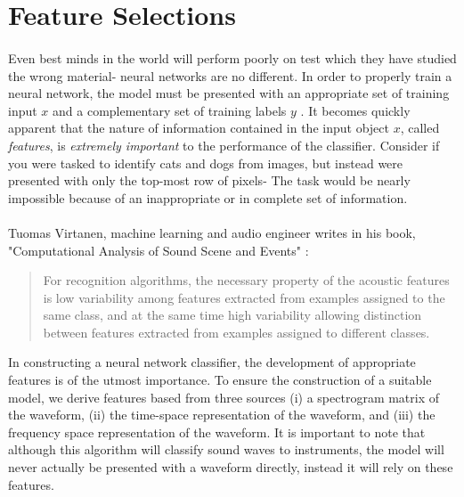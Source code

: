 \documentclass[12pt,letterpaper]{article}
\begin{document}

\section{Feature Selections}
\label{sec-FeatureSelections}

\paragraph*{}Even best minds in the world will perform poorly on test which they have studied the wrong material- neural networks are no different. In order to properly train a neural network, the model must be presented with an appropriate set of training input $x$ and a complementary set of training labels $y$ \cite{Geron,Goodfellow,James}. It becomes quickly apparent that the nature of information contained in the input object $x$, called \textit{features}, is \textit{extremely important} to the performance of the classifier. Consider if you were tasked to identify cats and dogs from images, but instead were presented with only the top-most row of pixels- The task would be nearly impossible because of an inappropriate or in complete set of information.

\paragraph*{}Tuomas Virtanen, machine learning and audio engineer writes in his book, "Computational Analysis of Sound Scene and Events" \cite{Virtanen}:
\begin{quote}
For recognition algorithms, the necessary property of the acoustic features is low variability among features extracted from examples assigned to the same class, and at the same time high variability allowing distinction between features extracted from examples assigned to different classes.
\end{quote}
In constructing a neural network classifier, the development of appropriate features is of the utmost importance. To ensure the construction of a suitable model, we derive features based from three sources (i) a spectrogram matrix of the waveform, (ii) the time-space representation of the waveform, and (iii) the frequency space representation of the waveform. It is important to note that although this algorithm will classify sound waves to instruments, the model will never actually be presented with a waveform directly, instead it will rely on these features.
\end{document}
